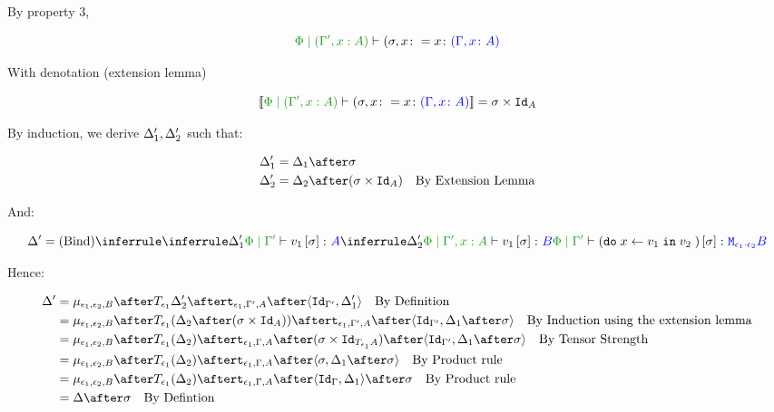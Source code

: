 \documentclass{report}
\begin{document}
By property 3,

\begin{equation}
    \etyperelation{\P}{(\G', x:A)}{(\si, x\setto x}{(\gax)}
\end{equation}

With denotation (extension lemma)

\begin{equation}
    \deno{\etyperelation{\P}{(\G', x:A)}{(\si, x\setto x}{(\gax)}} = \si\times\Id{A}
\end{equation}

By induction, we derive $\Delta_1', \Delta_2'$ such that:

\begin{align*}
    \D_1' & = \D_1\after \si\\
    \D_2' & = \D_2\after (\si\times\Id{A})\qt{By Extension Lemma}
\end{align*}

And:

\begin{equation}
    \D' = \ntreeruleII{Bind}{
        \treeruleI{\D_1'}{\etyperelation{\P}{\G'}{v_1\ssi}{A}}
        }{
        \treeruleI{\D_2'}{\etyperelation{\P}{\G', x:A }{v_1\ssi}{B}}
    }{
        \etyperelation{\P}{\G'}{(\doin{x}{v_1}{v_2})\ssi}{\M{\e_1\dot\e_2}{B}}
    }
\end{equation}

Hence:

\begin{align*}
    \D' & = \bind{\e_1}{\e_2}{B}\after\T{\e_1}{\D_2'}\after\tstrength{\e_1}{\G'}{A}\after\pr{\Id{\G'}}{\D_1'}\qt{By Definition}\\
    & = \bind{\e_1}{\e_2}{B}\after\T{\e_1}{(\D_2\after(\si\times\Id{A}))}\after\tstrength{\e_1}{\G'}{A}\after\pr{\Id{\G'}}{\D_1\after\si}\qt{By Induction using the extension lemma}\\
    & = \bind{\e_1}{\e_2}{B}\after\T{\e_1}{(\D_2)}\after\tstrength{\e_1}{\G}{A}\after(\si\times\Id{\T{\e_1}{A}})\after\pr{\Id{\G'}}{\D_1\after\si}\qt{By Tensor Strength}\\
    & = \bind{\e_1}{\e_2}{B}\after\T{\e_1}{(\D_2)}\after\tstrength{\e_1}{\G}{A}\after\pr{\si}{\D_1\after\si}\qt{By Product rule}\\
    & = \bind{\e_1}{\e_2}{B}\after\T{\e_1}{(\D_2)}\after\tstrength{\e_1}{\G}{A}\after\pr{\idg}{\D_1}\after\si\qt{By Product rule}\\
    &= \D\after\si\qt{By Defintion}\\
\end{align*}
\end{document}
